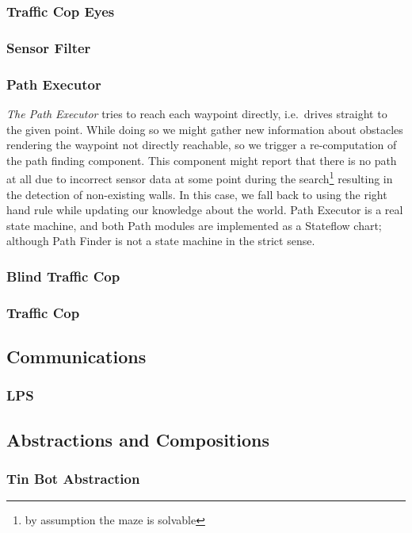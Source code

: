 \documentclass[a4paper,parskip,headheight=38pt]{scrartcl} %
\begin{document}
\subsubsection{Traffic Cop Eyes}
\subsubsection{Sensor Filter}

\subsubsection{Path Executor}
\emph{The Path Executor} tries to reach each waypoint directly, i.e.\ drives straight to the given point. 
While doing so we might gather new information about obstacles rendering the waypoint not directly reachable, so we trigger a re-computation of the path finding component. 
This component might report that there is no path at all due to incorrect sensor data at some point during the search\footnote{by assumption the maze is solvable} resulting in the detection of non-existing walls. 
In this case, we fall back to using the right hand rule while updating our knowledge about the world. Path Executor is a real state machine, and both Path modules are implemented as a Stateflow chart; although Path Finder is not a state machine in the strict sense.

\subsubsection{Blind Traffic Cop}
\subsubsection{Traffic Cop}

\subsection{Communications}
\subsubsection{LPS}

\subsection{Abstractions and Compositions}
\subsubsection{Tin Bot Abstraction}
\end{document}
